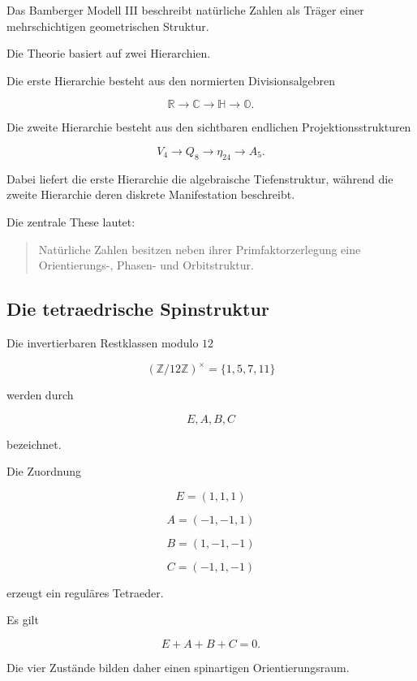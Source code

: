 \documentclass[11pt,a4paper]{article}
\theoremstyle{definition}
\theoremstyle{remark}
\begin{document}
	Das Bamberger Modell III beschreibt natürliche Zahlen als Träger
	einer mehrschichtigen geometrischen Struktur.
	
	Die Theorie basiert auf zwei Hierarchien.
	
	Die erste Hierarchie besteht aus den normierten Divisionsalgebren
	
	\[
	\mathbb R
	\longrightarrow
	\mathbb C
	\longrightarrow
	\mathbb H
	\longrightarrow
	\mathbb O.
	\]
	
	Die zweite Hierarchie besteht aus den sichtbaren endlichen
	Projektionsstrukturen
	
	\[
	V_4
	\longrightarrow
	Q_8
	\longrightarrow
	\eta_{24}
	\longrightarrow
	A_5.
	\]
	
	Dabei liefert die erste Hierarchie die algebraische Tiefenstruktur,
	während die zweite Hierarchie deren diskrete Manifestation beschreibt.
	
	\bigskip
	
	Die zentrale These lautet:
	
	\begin{quote}
	Natürliche Zahlen besitzen neben ihrer Primfaktorzerlegung
	eine Orientierungs-, Phasen- und Orbitstruktur.
	\end{quote}
	
	\bigskip
	
	
	\subsection{Die tetraedrische Spinstruktur}
	
	Die invertierbaren Restklassen modulo \(12\)
	
	\[
	(\mathbb Z/12\mathbb Z)^\times
	=
	\{1,5,7,11\}
	\]
	
	werden durch
	
	\[
	E,A,B,C
	\]
	
	bezeichnet.
	
	Die Zuordnung
	
	\[
	E=(1,1,1)
	\]
	
	\[
	A=(-1,-1,1)
	\]
	
	\[
	B=(1,-1,-1)
	\]
	
	\[
	C=(-1,1,-1)
	\]
	
	erzeugt ein reguläres Tetraeder.
	
	Es gilt
	
	\[
	E+A+B+C=0.
	\]
	
	Die vier Zustände bilden daher einen
	spinartigen Orientierungsraum.
	
\end{document}
